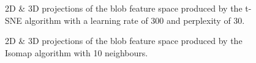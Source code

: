 \begin{figure}[H]
	\centering
	\caption{2D \& 3D projections of the blob feature space produced by the t-SNE algorithm with a learning rate of 300 and perplexity of 30.}\label{fig:blob_SNE_mapping}
\end{figure}

\begin{figure}[H]
	\centering
	\caption{2D \& 3D projections of the blob feature space  produced by the Isomap algorithm with 10 neighbours.}\label{fig:blob_iso_mapping}
\end{figure}

